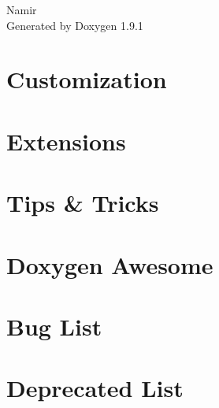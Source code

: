 \let\mypdfximage\pdfximage\def\pdfximage{\immediate\mypdfximage}\documentclass[twoside]{book}
\newcommand{\+}{\discretionary{\mbox{\scriptsize$\hookleftarrow$}}{}{}}
\newcommand{\clearemptydoublepage}{%
  \newpage{\pagestyle{empty}\cleardoublepage}%
}
\begin{document}
\raggedbottom

\hypersetup{pageanchor=false,
             bookmarksnumbered=true,
             pdfencoding=unicode
            }
\begin{titlepage}
\vspace*{7cm}
\begin{center}%
{\Large Namir }\\
\vspace*{1cm}
{\large Generated by Doxygen 1.9.1}\\
\end{center}
\end{titlepage}
\clearemptydoublepage
{}
\tableofcontents
\clearemptydoublepage
{}
\hypersetup{pageanchor=true}

\chapter{Customization}
\label{md_doxygen_awesome_css_docs_customization}

\chapter{Extensions}
\label{md_doxygen_awesome_css_docs_extensions}

\chapter{Tips \& Tricks}
\label{md_doxygen_awesome_css_docs_tricks}

\chapter{Doxygen Awesome}
\label{md_doxygen_awesome_css_README}

\chapter{Bug List}
\label{bug}

\chapter{Deprecated List}
\label{deprecated}

\end{document}
